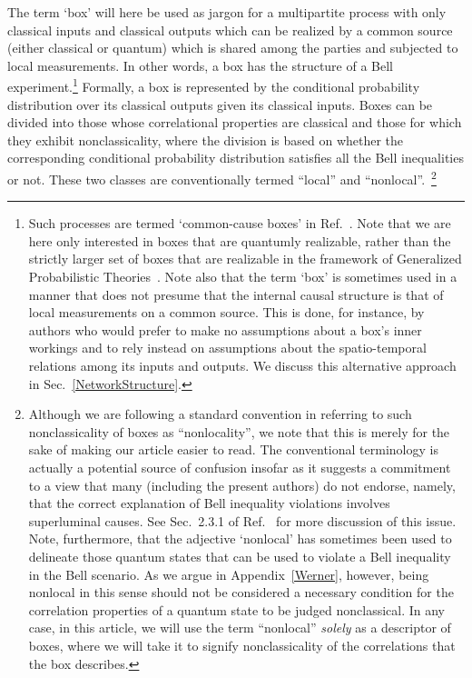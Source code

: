 \documentclass[12pt]{article}
\theoremstyle{plain}
\theoremstyle{definition}
\begin{document}
The term `box' will here be used as jargon for a  multipartite process with only classical inputs and classical outputs   which can be realized by a common source 
    (either classical or quantum) which is shared among the parties and subjected to local measurements.  In other words, a box has the structure of a Bell experiment.\footnote{Such processes are termed `common-cause boxes' in Ref.~\cite{wolfe2020quantifying}.  Note that we are here only interested in boxes that are quantumly realizable, rather than the strictly larger set of boxes that are realizable in the framework of Generalized Probabilistic Theories~\cite{barrettGPT,hardy01}.
    Note also that the term `box' is sometimes used in a manner that does not presume that the internal causal structure is that of local measurements on a common source. This is done, for instance, by authors who would prefer to make no assumptions about a box's inner workings and to rely instead on assumptions about the spatio-temporal relations among its inputs and outputs.  We discuss this alternative approach in Sec.~\ref{NetworkStructure}.
}
Formally, a box is represented by the conditional probability distribution over its classical outputs given its classical inputs. Boxes can be divided into those whose correlational properties are classical and those for which they exhibit nonclassicality, where the division is based on whether the corresponding conditional probability distribution satisfies  all the Bell inequalities or not.  These two classes are conventionally termed ``local'' and ``nonlocal''.~\footnote{\label{footnote:nolocality}Although we are following a standard convention in referring to such nonclassicality of boxes as 
  ``nonlocality'', we note that this is merely for the sake of making our article easier to read. 
The conventional terminology is actually a potential source of confusion insofar as it suggests  a commitment to a view that many (including the present authors) do not endorse, namely, that the correct explanation of Bell inequality violations
involves superluminal causes.  See Sec.~2.3.1 of Ref.~\cite{wolfe2020quantifying} for more discussion of this issue.
 Note, furthermore, that the adjective `nonlocal' has sometimes been used to delineate those quantum states that can be used to violate a Bell inequality in the Bell scenario. As we argue in Appendix~\ref{Werner},
  however, being nonlocal in this sense should not be considered a necessary condition for the correlation properties of a quantum state to be judged nonclassical. 
 In any case, in this article, we will use the term ``nonlocal'' {\em solely} as a descriptor of boxes, where we will take it to signify nonclassicality of the correlations that the box describes.  }
  
\end{document}
